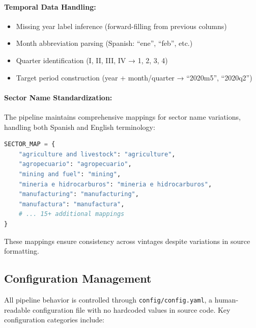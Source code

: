 \documentclass[a4paper, fleqn, 11pt]{article}
\newcommand{\filepath}[1]{\texttt{#1}}
\begin{document}
\paragraph{Temporal Data Handling:}
\begin{itemize}
    \item Missing year label inference (forward-filling from previous columns)
    \item Month abbreviation parsing (Spanish: ``ene'', ``feb'', etc.)
    \item Quarter identification (I, II, III, IV → 1, 2, 3, 4)
    \item Target period construction (year + month/quarter → ``2020m5'', ``2020q2'')
\end{itemize}

\paragraph{Sector Name Standardization:}
The pipeline maintains comprehensive mappings for sector name variations, handling both Spanish and English terminology:

\begin{lstlisting}[language=Python, caption={Example: Sector name standardization}, label={lst:sector}]
SECTOR_MAP = {
    "agriculture and livestock": "agriculture",
    "agropecuario": "agropecuario",
    "mining and fuel": "mining",
    "mineria e hidrocarburos": "mineria e hidrocarburos",
    "manufacturing": "manufacturing",
    "manufactura": "manufactura",
    # ... 15+ additional mappings
}
\end{lstlisting}

These mappings ensure consistency across vintages despite variations in source formatting.

\subsection{Configuration Management}

All pipeline behavior is controlled through \filepath{config/config.yaml}, a human-readable configuration file with no hardcoded values in source code. Key configuration categories include:
\end{document}

